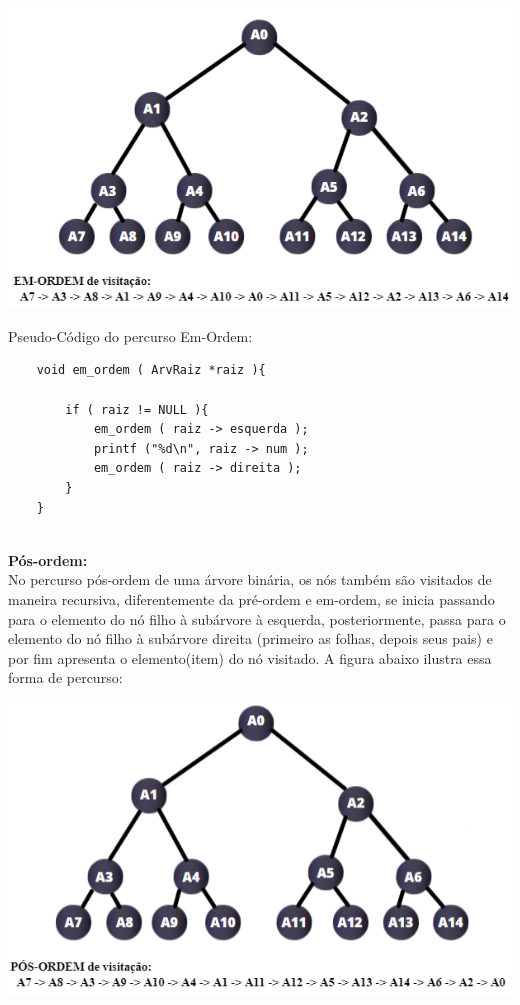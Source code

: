 \documentclass[11pt]{article} %
\begin{document}
\begin{enumerate}[a)]
	
		\begin{center}
			\includegraphics{q1bEmOrdem.png}
		\end{center}

	Pseudo-Código do percurso Em-Ordem:
	\begin{lstlisting}
	void em_ordem ( ArvRaiz *raiz ){

		if ( raiz != NULL ){
			em_ordem ( raiz -> esquerda );
			printf ("%d\n", raiz -> num );
			em_ordem ( raiz -> direita );
		}
	}


	\end{lstlisting}

\newpage

		{\bf Pós-ordem:} \\
	\hspace*{1cm}No percurso pós-ordem de uma árvore binária, os nós também são visitados de maneira recursiva, diferentemente da pré-ordem e em-ordem, se inicia passando para o elemento do nó filho à subárvore à esquerda, posteriormente, passa para o elemento do nó filho à subárvore direita (primeiro as folhas, depois seus pais) e por fim apresenta o elemento(item) do nó visitado. A figura abaixo ilustra essa forma de percurso:

		\begin{center}
			\includegraphics{q1bPosOrdem.png}
		\end{center}


\end{enumerate}
\end{document}
